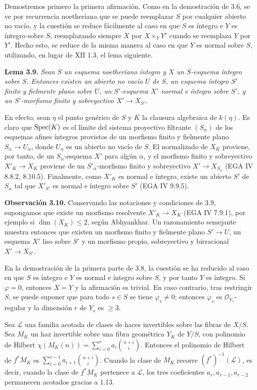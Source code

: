 Demostremos primero la primera afirmación. Como en la demostración de 3.6,
se ve por recurrencia noetheriana que se puede reemplazar $S$ por cualquier
abierto no vacío, y la cuestión se reduce fácilmente al caso en que $S$ es
íntegro e $Y$ es íntegro sobre $S$, reemplazando siempre $X$ por
$X\times_YY'$ cuando se reemplaza $Y$ por $Y'$. Hecho esto, se reduce de la
misma manera al caso en que $Y$ es normal sobre $S$, utilizando, en lugar de
XII 1.3, el lema siguiente.

\textbf{Lema 3.9.} \emph{Sean $S$ un esquema noetheriano íntegro y $X$ un
$S$-esquema íntegro sobre $S$. Entonces existen un abierto no vacío $U$ de
$S$, un esquema íntegro $S'$ finito y fielmente plano sobre $U$, un
$S'$-esquema $X'$ normal e íntegro sobre $S'$, y un $S'$-morfismo finito y
sobreyectivo $X'\to X_{S'}$.}

En efecto, sean $\eta$ el punto genérico de $S$ y $K$ la clausura algebraica
de $k(\eta)$. Es claro que $\operatorname{Spec}(K)$ es el límite del sistema proyectivo
filtrante $(S_\alpha)$ de los esquemas afines íntegros provistos de un
morfismo finito y fielmente plano $S_\alpha\to U_\alpha$, donde $U_\alpha$
es un abierto no vacío de $S$. El normalizado de $X_K$ proviene, por tanto,
de un $S_\alpha$-esquema $X'$ para algún $\alpha$, y el morfismo finito y
sobreyectivo $X'_K\to X_K$ proviene de un $S'_\alpha$-morfismo finito y
sobreyectivo $X'\to X_{S_\alpha}$ (EGA IV 8.8.2, 8.10.5). Finalmente, como
$X'_K$ es normal e íntegro, existe un abierto $S'$ de $S_\alpha$ tal que
$X'_{S'}$ es normal e íntegro sobre $S'$ (EGA IV 9.9.5).

\textbf{Observación 3.10.} Conservando las notaciones y condiciones de 3.9,
supongamos que existe un morfismo resolvente $X'_K\to X_K$ (EGA IV 7.9.1),
por ejemplo si $\dim(X_K)\leq2$, según Abhyankhar. Un razonamiento semejante
muestra entonces que existen un morfismo finito y fielmente plano
$S'\to U$, un esquema $X'$ liso sobre $S'$ y un morfismo propio,
sobreyectivo y birracional $X'\to X_{S'}$.

En la demostración de la primera parte de 3.8, la cuestión se ha reducido al
caso en que $S$ es íntegro e $Y$ es normal e íntegro sobre $S$, y por tanto
$Y$ es íntegro. Si $\varphi=0$, entonces $X=Y$ y la afirmación es trivial.
En caso contrario, tras restringir $S$, se puede suponer que para todo
$s\in S$ se tiene $\varphi_s\ne0$; entonces $\varphi_s$ es
$\mathcal O_{Y_s}$-regular y la dimensión $r$ de $Y_s$ es $\geq3$.

Sea $\mathcal L$ una familia acotada de clases de haces invertibles sobre
las fibras de $X/S$. Sea $M_K$ un haz invertible sobre una fibra geométrica
$Y_K$ de $Y/S$, con polinomio de Hilbert
$\chi(M_K(n))=\sum_{i=0}^{r}a_i\binom{n+i}{i}$. Entonces el polinomio de
Hilbert de $f^*M_K$ es
$\sum_{i=0}^{r-1}a_{i+1}\binom{n+i}{i}$. Cuando la clase de $M_K$ recorre
$(f^*)^{-1}(\mathcal L)$, es decir, cuando la clase de $f^*M_K$ pertenece a
$\mathcal L$, los tres coeficientes $a_r,a_{r-1},a_{r-2}$ permanecen
acotados gracias a 1.13.

